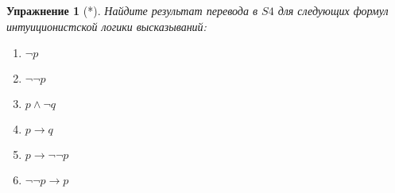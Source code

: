 \documentclass[11pt]{article}
\newtheorem{exercise}[theorem]{Упражнение}
\begin{document}
\begin{exercise}[*] Найдите результат перевода в $S4$ для следующих формул интуиционистской логики высказываний:
\begin{multicols}{3}
\begin{enumerate}
\item $\neg p$	
\item $\neg \neg p$	
\item $p \wedge \neg q$
\item $p \to q$
\item $p \to \neg \neg p$
\item $\neg \neg p \to p  $
\end{enumerate}
\end{multicols}	
\end{exercise}
\end{document}
